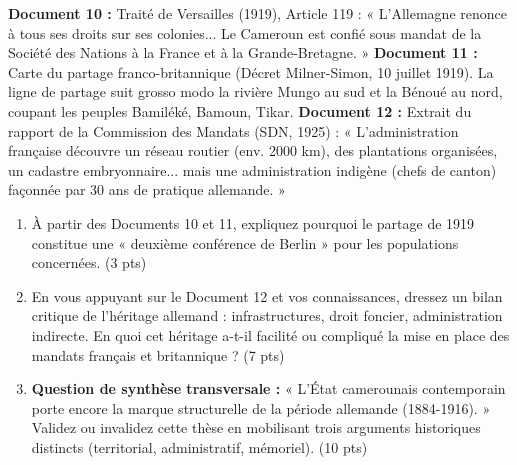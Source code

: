 \documentclass[11pt]{article}
\begin{document}
\begin{exercice}
\textbf{Document 10 :} Traité de Versailles (1919), Article 119 : « L'Allemagne renonce à tous ses droits sur ses colonies... Le Cameroun est confié sous mandat de la Société des Nations à la France et à la Grande-Bretagne. »
\textbf{Document 11 :} Carte du partage franco-britannique (Décret Milner-Simon, 10 juillet 1919). La ligne de partage suit grosso modo la rivière Mungo au sud et la Bénoué au nord, coupant les peuples Bamiléké, Bamoun, Tikar.
\textbf{Document 12 :} Extrait du rapport de la Commission des Mandats (SDN, 1925) : « L'administration française découvre un réseau routier (env. 2000 km), des plantations organisées, un cadastre embryonnaire... mais une administration indigène (chefs de canton) façonnée par 30 ans de pratique allemande. »

\begin{enumerate}
    \item À partir des Documents 10 et 11, expliquez pourquoi le partage de 1919 constitue une « deuxième conférence de Berlin » pour les populations concernées. (3 pts)
    \item En vous appuyant sur le Document 12 et vos connaissances, dressez un bilan critique de l'héritage allemand : infrastructures, droit foncier, administration indirecte. En quoi cet héritage a-t-il facilité ou compliqué la mise en place des mandats français et britannique ? (7 pts)
    \item \textbf{Question de synthèse transversale :} « L'État camerounais contemporain porte encore la marque structurelle de la période allemande (1884-1916). » Validez ou invalidez cette thèse en mobilisant trois arguments historiques distincts (territorial, administratif, mémoriel). (10 pts)
\end{enumerate}
\end{exercice}
\end{document}
